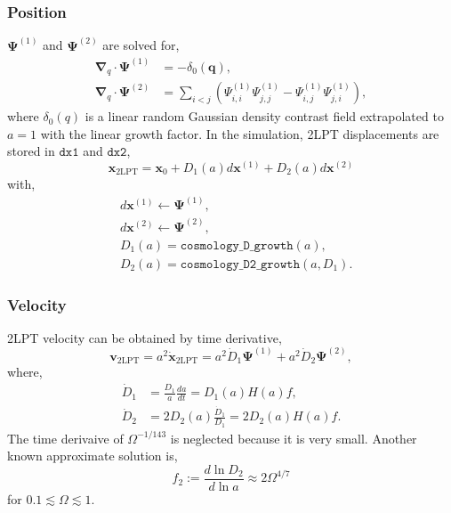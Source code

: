 \documentclass[a4paper]{article}
\begin{document}
\subsubsection{Position}
$\bm{\Psi}^{(1)}$ and $\bm{\Psi}^{(2)}$ are solved for,
\begin{align}
  \bm{\nabla}_q \cdot \bm{\Psi}^{(1)} &= - \delta_0(\bm{q}),\\
  \bm{\nabla}_q \cdot \bm{\Psi}^{(2)} &= \sum_{i < j}
    \left( \Psi^{(1)}_{i,i} \Psi^{(1)}_{j,j} - \Psi^{(1)}_{i,j} \Psi^{(1)}_{j,i}
    \right),
\end{align}
where $\delta_0(q)$ is a linear random Gaussian density contrast field
extrapolated to $a=1$ with the linear growth factor.
%
In the simulation, 2LPT displacements are stored in $\texttt{dx1}$ and $\texttt{dx2}$,
\begin{equation}
  \bm{x}_\mathrm{2LPT} = \bm{x}_0 + D_1(a) d\bm{x}^{(1)} + D_2(a) d\bm{x}^{(2)}
\end{equation}
with,
\begin{align}
  &d\bm{x}^{(1)} \leftarrow \bm{\Psi}^{(1)},\\
  &d\bm{x}^{(2)} \leftarrow \bm{\Psi}^{(2)},\\
  &D_1(a) = \texttt{cosmology\_D\_growth}(a),\\
  &D_2(a) =  \texttt{cosmology\_D2\_growth}(a, D_1).          
\end{align}

\subsubsection{Velocity}
2LPT velocity can be obtained by time derivative,
%
\begin{equation}
  \bm{v}_\mathrm{2LPT} = a^2 \dot{\bm{x}}_\mathrm{2LPT} =
    a^2 \dot{D}_1 \bm{\Psi}^{(1)} + a^2 \dot{D}_2 \bm{\Psi}^{(2)},
\end{equation}
where,
\begin{align}
  \dot{D}_1 &= \frac{D_1}{a}\frac{da}{dt} = D_1(a) H(a) f,\\
  \dot{D}_2 &= 2 D_2(a) \frac{\dot{D}_1}{D_1} = 2 D_2(a) H(a) f.
\end{align}
The time derivaive of $\Omega^{-1/143}$ is neglected because it is very
small. Another known approximate solution is,
\begin{equation}
  f_2 := \frac{d\ln D_2}{d\ln a} \approx 2 \Omega^{4/7}
\end{equation}
for $0.1 \lesssim \Omega \lesssim 1$.\\
\end{document}
